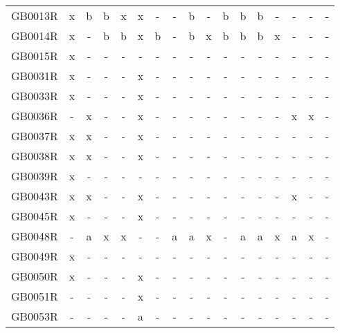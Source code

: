 \begin{table}
{{\begin{tabular}{l|cccccccccccccccc}
        GB0013R &  x &   b &    b &      x &   x &    - &    - &    b &      - &    b &    b &   b &      - &    - &    - &     - \\
        GB0014R &  x &   - &    b &      b &   x &    b &    - &    b &      x &    b &    b &   b &      x &    - &    - &     - \\
        GB0015R &  x &   - &    - &      - &   - &    - &    - &    - &      - &    - &    - &   - &      - &    - &    - &     - \\
        GB0031R &  x &   - &    - &      - &   x &    - &    - &    - &      - &    - &    - &   - &      - &    - &    - &     - \\
        GB0033R &  x &   - &    - &      - &   x &    - &    - &    - &      - &    - &    - &   - &      - &    - &    - &     - \\
        GB0036R &  - &   x &    - &      - &   x &    - &    - &    - &      - &    - &    - &   - &      - &    x &    x &     - \\
        GB0037R &  x &   x &    - &      - &   x &    - &    - &    - &      - &    - &    - &   - &      - &    - &    - &     - \\
        GB0038R &  x &   x &    - &      - &   x &    - &    - &    - &      - &    - &    - &   - &      - &    - &    - &     - \\
        GB0039R &  x &   - &    - &      - &   - &    - &    - &    - &      - &    - &    - &   - &      - &    - &    - &     - \\
        GB0043R &  x &   x &    - &      - &   x &    - &    - &    - &      - &    - &    - &   - &      - &    x &    - &     - \\
        GB0045R &  x &   - &    - &      - &   x &    - &    - &    - &      - &    - &    - &   - &      - &    - &    - &     - \\
        GB0048R &  - &   a &    x &      x &   - &    - &    a &    a &      x &    - &    a &   a &      x &    a &    x &     - \\
        GB0049R &  x &   - &    - &      - &   - &    - &    - &    - &      - &    - &    - &   - &      - &    - &    - &     - \\
        GB0050R &  x &   - &    - &      - &   x &    - &    - &    - &      - &    - &    - &   - &      - &    - &    - &     - \\
        GB0051R &  - &   - &    - &      - &   x &    - &    - &    - &      - &    - &    - &   - &      - &    - &    - &     - \\
        GB0053R &  - &   - &    - &      - &   a &    - &    - &    - &      - &    - &    - &   - &      - &    - &    - &     - \\

\end{tabular}}}
\end{table}
